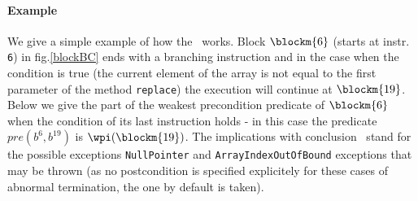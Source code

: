 \paragraph{Example} We give a simple example of how the \wpi \ works. Block $\blockm{6}$ (starts at instr. \texttt{6}) in fig.\ref{blockBC} ends with a branching instruction and in the case when the condition is true (the current element of the array is not equal to the first parameter of the method \texttt{replace}) the execution will continue at $\blockm{19}$. Below we give the part of the weakest precondition predicate of $\blockm{6}$ when the condition of its last instruction holds - in this case 
the predicate $pre(b^{6}, b^{19})$ is $\wpi(\blockm{19})$.  The implications with conclusion \Myfalse \ stand for the possible exceptions \texttt{NullPointer} and \texttt{ArrayIndexOutOfBound} exceptions that may be thrown (as no postcondition is specified explicitely for these cases of abnormal termination, the one by default is taken). 






